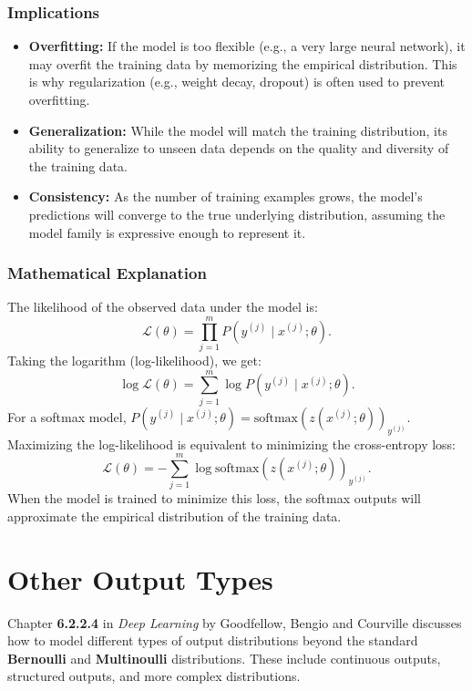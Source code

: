 \begin{notechapter}
\subsubsection{Implications}
\begin{itemize}
    \item \textbf{Overfitting:} If the model is too flexible (e.g., a very large neural network), it may overfit the training data by memorizing the empirical distribution. This is why regularization (e.g., weight decay, dropout) is often used to prevent overfitting.
    \item \textbf{Generalization:} While the model will match the training distribution, its ability to generalize to unseen data depends on the quality and diversity of the training data.
    \item \textbf{Consistency:} As the number of training examples grows, the model's predictions will converge to the true underlying distribution, assuming the model family is expressive enough to represent it.
\end{itemize}

\subsubsection{Mathematical Explanation}
The likelihood of the observed data under the model is:
\[
\mathcal{L}(\theta) = \prod_{j=1}^m P(y^{(j)} \mid x^{(j)}; \theta).
\]
Taking the logarithm (log-likelihood), we get:
\[
\log \mathcal{L}(\theta) = \sum_{j=1}^m \log P(y^{(j)} \mid x^{(j)}; \theta).
\]
For a softmax model, \( P(y^{(j)} \mid x^{(j)}; \theta) = \text{softmax}(z(x^{(j)}; \theta))_{y^{(j)}} \). Maximizing the log-likelihood is equivalent to minimizing the cross-entropy loss:
\[
\mathcal{L}(\theta) = -\sum_{j=1}^m \log \text{softmax}(z(x^{(j)}; \theta))_{y^{(j)}}.
\]
When the model is trained to minimize this loss, the softmax outputs will approximate the empirical distribution of the training data.

\section{Other Output Types}
Chapter \textbf{6.2.2.4} in \textit{Deep Learning} by Goodfellow, Bengio and Courville discusses how to model different types of output distributions beyond the standard \textbf{Bernoulli} and \textbf{Multinoulli} distributions. These include continuous outputs, structured outputs, and more complex distributions.


\end{notechapter}
